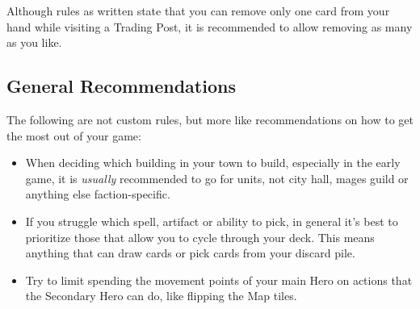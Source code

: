\begin{multicols*}{2}
Although rules as written state that you can remove only one card from your hand while visiting a Trading Post, it is recommended to allow removing as many as you like.

\subsection*{General Recommendations}

The following are not custom rules, but more like recommendations on how to get the most out of your game:
\begin{itemize}
  \item When deciding which building in your town to build, especially in the early game, it is \textit{usually} recommended to go for units, not city hall, mages guild or anything else faction-specific.
  \item If you struggle which spell, artifact or ability to pick, in general it's best to prioritize those that allow you to cycle through your deck.
    This means anything that can draw cards or pick cards from your discard pile.
  \item Try to limit spending the movement points of your main Hero on actions that the Secondary Hero can do, like flipping the Map tiles.
\end{itemize}

\end{multicols*}
